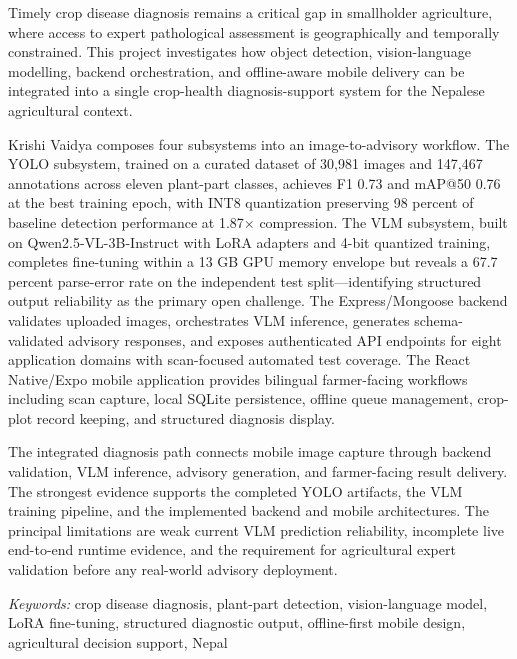 
Timely crop disease diagnosis remains a critical gap in smallholder agriculture, where access to
expert pathological assessment is geographically and temporally constrained. This project
investigates how object detection, vision-language modelling, backend orchestration, and
offline-aware mobile delivery can be integrated into a single crop-health diagnosis-support
system for the Nepalese agricultural context.

Krishi Vaidya composes four subsystems into an image-to-advisory workflow. The YOLO subsystem,
trained on a curated dataset of 30,981 images and 147,467 annotations across eleven plant-part
classes, achieves F1 0.73 and mAP@50 0.76 at the best training epoch, with INT8 quantization
preserving 98 percent of baseline detection performance at 1.87$\times$ compression. The VLM
subsystem, built on Qwen2.5-VL-3B-Instruct with LoRA adapters and 4-bit quantized training,
completes fine-tuning within a 13 GB GPU memory envelope but reveals a 67.7 percent parse-error
rate on the independent test split---identifying structured output reliability as the primary
open challenge. The Express/Mongoose backend validates uploaded images, orchestrates VLM
inference, generates schema-validated advisory responses, and exposes authenticated API endpoints
for eight application domains with scan-focused automated test coverage. The React Native/Expo
mobile application provides bilingual farmer-facing workflows including scan capture, local
SQLite persistence, offline queue management, crop-plot record keeping, and structured diagnosis
display.

The integrated diagnosis path connects mobile image capture through backend validation, VLM
inference, advisory generation, and farmer-facing result delivery. The strongest evidence
supports the completed YOLO artifacts, the VLM training pipeline, and the implemented
backend and mobile architectures. The principal limitations are weak current VLM prediction
reliability, incomplete live end-to-end runtime evidence, and the requirement for agricultural
expert validation before any real-world advisory deployment.

\vspace{2\baselineskip}
\noindent\textit{\fontsize{10}{12}\selectfont Keywords:} {\fontsize{10}{12}\selectfont crop disease diagnosis, plant-part detection, vision-language model, LoRA fine-tuning, structured diagnostic output, offline-first mobile design, agricultural decision support, Nepal}

